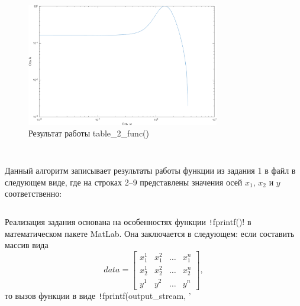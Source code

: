 \begin{figure}[H]
    \centering
    \includegraphics[width=0.75\textwidth]{figs/table_2_func_result.png}
    \caption{Результат работы table\_2\_func()}
    \label{fig:table_2_func_result.png}
\end{figure}




\subsection*{  }
\begin{quote}
    \textit{\exThree}
\end{quote}



\begin{codemultipage}
    \inputminted{matlab}{code/write_results.m}
\end{codemultipage}


Данный алгоритм записывает результаты работы функции из задания 1 в файл в следующем виде, где на строках 2--9 представлены значения осей $x_1$, $x_2$ и $y$ соответственно:

\begin{codemultipage}
    \inputminted{x}{code/example_results.txt}
\end{codemultipage}

Реализация задания основана на особенностях функции \texttt!fprintf()! в математическом пакете MatLab.
Она заключается в следующем: если составить массив вида
$$
    data = \left[
    \begin{array}{cccc}
        x_1^1 & x_1^2 & \dots & x_1^n \\
        x_2^1 & x_2^2 & \dots & x_2^n \\
        y^1   & y^2   & \dots & y^n
    \end{array}
    \right],
$$
то вызов функции в виде \texttt!fprintf(output_stream, '%

